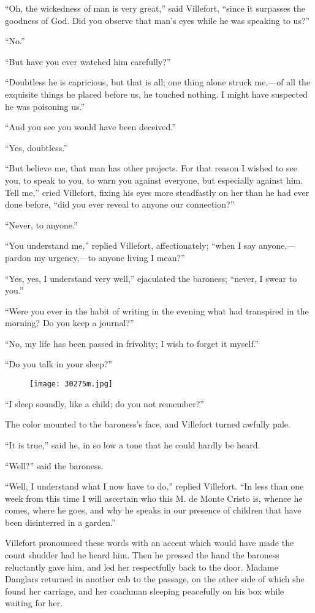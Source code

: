 “Oh, the wickedness of man is very great,” said Villefort, “since it
surpasses the goodness of God. Did you observe that man’s eyes while he
was speaking to us?”

“No.”

“But have you ever watched him carefully?”

“Doubtless he is capricious, but that is all; one thing alone struck
me,—of all the exquisite things he placed before us, he touched
nothing. I might have suspected he was poisoning us.”

“And you see you would have been deceived.”

“Yes, doubtless.”

“But believe me, that man has other projects. For that reason I wished
to see you, to speak to you, to warn you against everyone, but
especially against him. Tell me,” cried Villefort, fixing his eyes more
steadfastly on her than he had ever done before, “did you ever reveal
to anyone our connection?”

“Never, to anyone.”

“You understand me,” replied Villefort, affectionately; “when I say
anyone,—pardon my urgency,—to anyone living I mean?”

“Yes, yes, I understand very well,” ejaculated the baroness; “never, I
swear to you.”

“Were you ever in the habit of writing in the evening what had
transpired in the morning? Do you keep a journal?”

“No, my life has been passed in frivolity; I wish to forget it myself.”

“Do you talk in your sleep?”

\begin{figure}[ht]
\texttt{[image: 30275m.jpg]}
\end{figure}

“I sleep soundly, like a child; do you not remember?”

The color mounted to the baroness’s face, and Villefort turned awfully
pale.

“It is true,” said he, in so low a tone that he could hardly be heard.

“Well?” said the baroness.

“Well, I understand what I now have to do,” replied Villefort. “In less
than one week from this time I will ascertain who this M. de Monte
Cristo is, whence he comes, where he goes, and why he speaks in our
presence of children that have been disinterred in a garden.”

Villefort pronounced these words with an accent which would have made
the count shudder had he heard him. Then he pressed the hand the
baroness reluctantly gave him, and led her respectfully back to the
door. Madame Danglars returned in another cab to the passage, on the
other side of which she found her carriage, and her coachman sleeping
peacefully on his box while waiting for her.
